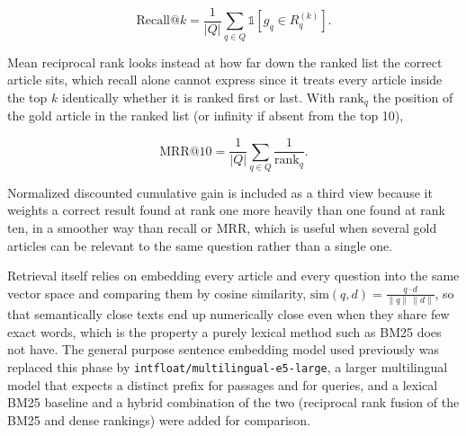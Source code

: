 \documentclass[11pt, a4paper]{article}
\begin{document}
\begin{equation}
\text{Recall@}k = \frac{1}{|Q|} \sum_{q \in Q} \mathbb{1}\!\left[g_q \in R_q^{(k)}\right].
\end{equation}

Mean reciprocal rank looks instead at how far down the ranked list the correct article sits, which recall alone cannot express since it treats every article inside the top $k$ identically whether it is ranked first or last. With $\text{rank}_q$ the position of the gold article in the ranked list (or infinity if absent from the top 10),

\begin{equation}
\text{MRR@}10 = \frac{1}{|Q|} \sum_{q \in Q} \frac{1}{\text{rank}_q}.
\end{equation}

Normalized discounted cumulative gain is included as a third view because it weights a correct result found at rank one more heavily than one found at rank ten, in a smoother way than recall or MRR, which is useful when several gold articles can be relevant to the same question rather than a single one.

Retrieval itself relies on embedding every article and every question into the same vector space and comparing them by cosine similarity, $\text{sim}(q,d) = \frac{q \cdot d}{\lVert q \rVert \, \lVert d \rVert}$, so that semantically close texts end up numerically close even when they share few exact words, which is the property a purely lexical method such as BM25 does not have. The general purpose sentence embedding model used previously was replaced this phase by \texttt{intfloat/multilingual-e5-large}, a larger multilingual model that expects a distinct prefix for passages and for queries, and a lexical BM25 baseline and a hybrid combination of the two (reciprocal rank fusion of the BM25 and dense rankings) were added for comparison.
\end{document}

